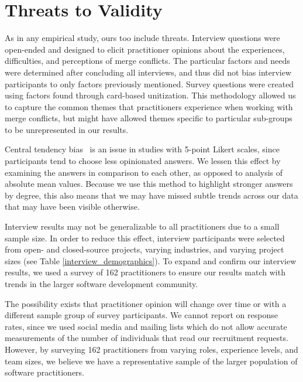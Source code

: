 \section{Threats to Validity}\label{threats}
As in any empirical study, ours too include threats.
Interview questions were open-ended and designed to elicit practitioner opinions about the experiences, difficulties, and perceptions of merge conflicts.
The particular factors and needs were determined after concluding all interviews, and thus did not bias interview participants to only factors previously mentioned.
Survey questions were created using factors found through card-based unitization.
This methodology allowed us to capture the common themes that practitioners experience when working with merge conflicts, but might have allowed themes specific to particular sub-groups to be unrepresented in our results.

Central tendency bias~\cite{guilford1954psychometric} is an issue in studies with 5-point Likert scales, since participants tend to choose less opinionated answers.
We lessen this effect by examining the answers in comparison to each other, as opposed to analysis of absolute mean values.
Because we use this method to highlight stronger answers by degree, this also means that we may have missed subtle trends across our data that may have been visible otherwise.

Interview results may not be generalizable to all practitioners due to a small sample size.
In order to reduce this effect, interview participants were selected from open- and closed-source projects, varying industries, and varying project sizes (see Table \ref{interview_demographics}).
To expand and confirm our interview results, we used a survey of 162 practitioners to ensure our results match with trends in the larger software development community.

The possibility exists that practitioner opinion will change over time or with a different sample group of survey participants.
We cannot report on response rates, since we used social media and mailing lists which do not allow accurate measurements of the number of individuals that read our recruitment requests.
However, by surveying 162 practitioners from varying roles, experience levels, and team sizes, we believe we have a representative sample of the larger population of software practitioners.




